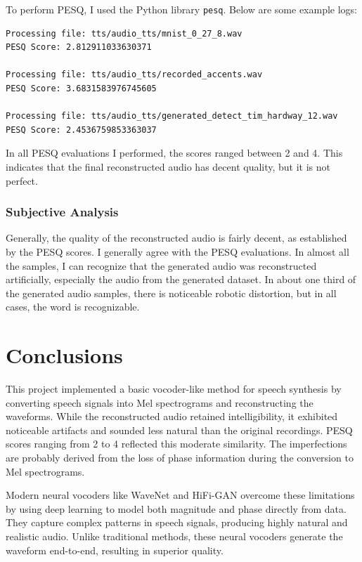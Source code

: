 \documentclass[12pt]{article}
\begin{document}
To perform PESQ, I used the Python library \texttt{pesq}. Below are some example logs:

\begin{verbatim}
Processing file: tts/audio_tts/mnist_0_27_8.wav
PESQ Score: 2.812911033630371

Processing file: tts/audio_tts/recorded_accents.wav
PESQ Score: 3.6831583976745605

Processing file: tts/audio_tts/generated_detect_tim_hardway_12.wav
PESQ Score: 2.4536759853363037
\end{verbatim}

In all PESQ evaluations I performed, the scores ranged between 2 and 4. This indicates that the final reconstructed audio has decent quality, but it is not perfect.

\subsubsection{Subjective Analysis}

Generally, the quality of the reconstructed audio is fairly decent, as established by the PESQ scores. I generally agree with the PESQ evaluations. In almost all the samples, I can recognize that the generated audio was reconstructed artificially, especially the audio from the generated dataset. In about one third of the generated audio samples, there is noticeable robotic distortion, but in all cases, the word is recognizable.


\section{Conclusions}

This project implemented a basic vocoder-like method for speech synthesis by converting speech signals into Mel spectrograms and reconstructing the waveforms. While the reconstructed audio retained intelligibility, it exhibited noticeable artifacts and sounded less natural than the original recordings. PESQ scores ranging from 2 to 4 reflected this moderate similarity. The imperfections are probably derived from the loss of phase information during the conversion to Mel spectrograms.

Modern neural vocoders like WaveNet and HiFi-GAN overcome these limitations by using deep learning to model both magnitude and phase directly from data. They capture complex patterns in speech signals, producing highly natural and realistic audio. Unlike traditional methods, these neural vocoders generate the waveform end-to-end, resulting in superior quality.
\end{document}
